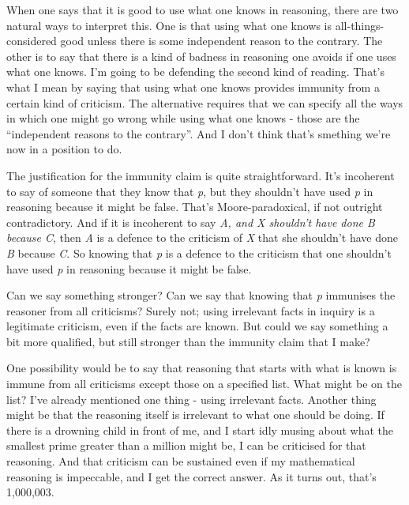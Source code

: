 \documentclass[
  11pt,
]{book}
\begin{document}
When one says that it is good to use what one knows in reasoning, there are two natural ways to interpret this. One is that using what one knows is all-things-considered good unless there is some independent reason to the contrary. The other is to say that there is a kind of badness in reasoning one avoids if one uses what one knows. I'm going to be defending the second kind of reading. That's what I mean by saying that using what one knows provides immunity from a certain kind of criticism. The alternative requires that we can specify all the ways in which one might go wrong while using what one knows - those are the ``independent reasons to the contrary''. And I don't think that's smething we're now in a position to do.

The justification for the immunity claim is quite straightforward. It's incoherent to say of someone that they know that \emph{p}, but they shouldn't have used \emph{p} in reasoning because it might be false. That's Moore-paradoxical, if not outright contradictory. And if it is incoherent to say \emph{A, and X shouldn't have done B because C}, then \emph{A} is a defence to the criticism of \emph{X} that she shouldn't have done \emph{B} because \emph{C}. So knowing that \emph{p} is a defence to the criticism that one shouldn't have used \emph{p} in reasoning because it might be false.

Can we say something stronger? Can we say that knowing that \emph{p} immunises the reasoner from all criticisms? Surely not; using irrelevant facts in inquiry is a legitimate criticism, even if the facts are known. But could we say something a bit more qualified, but still stronger than the immunity claim that I make?

One possibility would be to say that reasoning that starts with what is known is immune from all criticisms except those on a specified list. What might be on the list? I've already mentioned one thing - using irrelevant facts. Another thing might be that the reasoning itself is irrelevant to what one should be doing. If there is a drowning child in front of me, and I start idly musing about what the smallest prime greater than a million might be, I can be criticised for that reasoning. And that criticism can be sustained even if my mathematical reasoning is impeccable, and I get the correct answer. As it turns out, that's 1,000,003.
\end{document}
